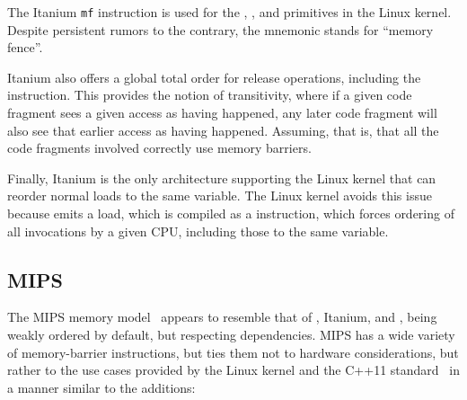 The Itanium {\tt mf} instruction is used for the ,
, and  primitives in the Linux kernel.
Despite persistent rumors to the contrary, the  mnemonic stands
for ``memory fence''.

Itanium also offers a global total order for release operations,
including the  instruction.
This provides the notion of transitivity, where if a given code fragment
sees a given access as having happened, any later code fragment will
also see that earlier access as having happened.
Assuming, that is, that all the code fragments involved correctly use
memory barriers.

Finally, Itanium is the only architecture supporting the Linux kernel
that can reorder normal loads to the same variable.
The Linux kernel avoids this issue because  emits
a  load, which is compiled as a  instruction,
which forces ordering of all  invocations by a given
CPU, including those to the same variable.

\subsection{MIPS}

The MIPS memory model~\cite[page~479]{MIPSvII-A-2016}
appears to resemble that of \ARM, Itanium, and \Power{},
being weakly ordered by default, but respecting dependencies.
MIPS has a wide variety of memory-barrier instructions, but ties them
not to hardware considerations, but rather to the use cases provided
by the Linux kernel and the C++11 standard~\cite{RichardSmith2019N4800}
in a manner similar to the  additions:

